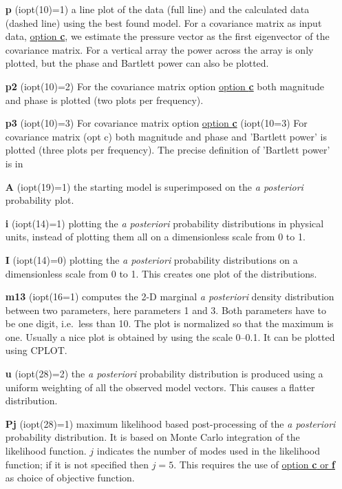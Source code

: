 \documentclass{saclantc}
\begin{document}
\vspace{-0.6cm}
\begin{itemize}
    \item[{\bf p}] (iopt(10)=1) a line plot of the data (full line)
 and the calculated
data (dashed line) using the best found model. For a covariance matrix
as input data, 
\underline{option {\bf c}}, we estimate the pressure vector 
as the first eigenvector of the covariance matrix. 
For a vertical array the power across the array is only plotted, but
the phase and Bartlett power can also be plotted.
 \vspace{-0.3cm}
   \item[{\bf p2}] (iopt(10)=2) For the covariance matrix option
\underline{option {\bf c}} both magnitude and phase is plotted (two plots per frequency).

\vspace{-0.3cm}
   \item[{\bf p3}] (iopt(10)=3) For covariance matrix option \underline{option {\bf c}} (iopt(10=3) For covariance matrix (opt c) both magnitude and phase and
   'Bartlett power' is plotted (three plots per frequency). The
   precise definition of 'Bartlett power' is in \cite{gerstoft:asa96}

\vspace{-0.3cm}
    \item[{\bf A}] (iopt(19)=1) the starting model is superimposed on the
{\it a posteriori } probability plot.
\vspace{-0.3cm}
    \item[{\bf i}] (iopt(14)=1) plotting the {\it a posteriori}
 probability distributions in physical
units, instead of plotting them all on a dimensionless scale from 0 to
1.
\vspace{-0.3cm}
    \item[{\bf I}] (iopt(14)=0) plotting the {\it a posteriori}
 probability distributions  on a dimensionless scale from 0 to 1.
This creates  one plot of the distributions.
\vspace{-0.3cm}
    \item[{\bf m13}] (iopt(16=1) computes the 2-D marginal {\it a
posteriori} density distribution between two parameters, here
parameters 1 and 3. Both
parameters have to be one digit, i.e.\ less than 10. 
The plot is normalized so that the maximum is one.
Usually a nice plot is obtained by using the scale 0--0.1.
It can be  plotted using {\sf CPLOT}.
\vspace{-0.3cm}
    \item[{\bf u}] (iopt(28)=2) the  {\it a posteriori} probability
distribution is produced using a uniform weighting of all the observed
model vectors. This causes a flatter distribution.
\vspace{-0.3cm}
    \item[{\bf Pj}] (iopt(28)=1) maximum likelihood based
post-processing of the {\it a posteriori} probability distribution. 
    It is based on Monte Carlo integration of the likelihood
function.  $j$ indicates the number of modes used in the likelihood
function; if it is not specified then  $j=5$. 
This requires the use of \underline{option {\bf c}
or  {\bf f}} as choice of objective function.
\end{itemize}
\end{document}
